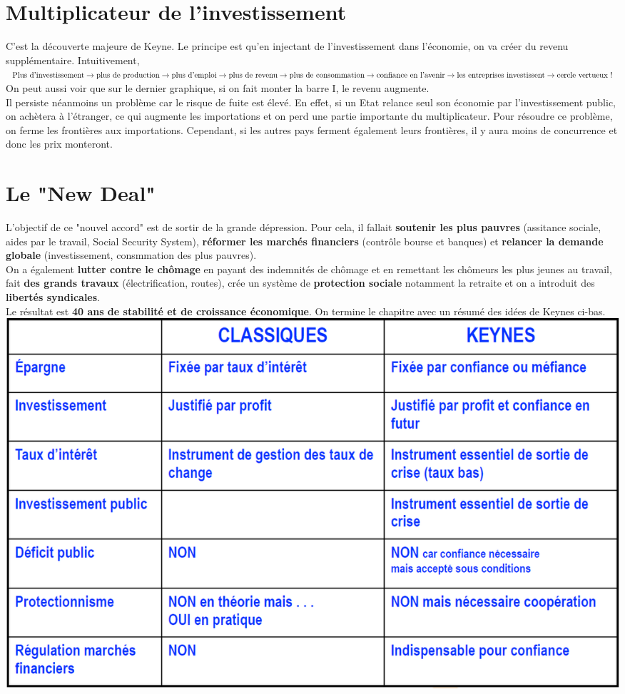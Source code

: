 \section{Multiplicateur de l'investissement}
C'est la découverte majeure de Keyne. Le principe est qu'en injectant de l'investissement dans l'économie, on va créer du revenu supplémentaire. Intuitivement, \\
$
\mbox{Plus d'investissement} \rightarrow \mbox{plus de production} \rightarrow  \mbox{plus d'emploi} \rightarrow \mbox{plus de revenu} \rightarrow \mbox{plus de consommation} \\ \rightarrow \mbox{confiance en l'avenir} \rightarrow \mbox{les entreprises investissent} \rightarrow \mbox{cercle vertueux !}
$ \\
On peut aussi voir que sur le dernier graphique, si on fait monter la barre I, le revenu augmente. \\
Il persiste néanmoins un problème car le risque de fuite est élevé. En effet, si un Etat relance seul son économie par l'investissement public, on achètera à l'étranger, ce qui augmente les importations et on perd une partie importante du multiplicateur. Pour résoudre ce problème, on ferme les frontières aux importations. Cependant, si les autres pays ferment également leurs frontières, il y aura moins de concurrence et donc les prix monteront. 

\section{Le "New Deal"}
L'objectif de ce "nouvel accord" est de sortir de la grande dépression. Pour cela, il fallait \textbf{soutenir les plus pauvres} (assitance sociale, aides par le travail, Social Security System), \textbf{réformer les marchés financiers} (contrôle bourse et banques) et \textbf{relancer la demande globale} (investissement, consmmation des plus pauvres). \\
On a également \textbf{lutter contre le chômage} en payant des indemnités de chômage et en remettant les chômeurs les plus jeunes au travail, fait \textbf{des grands travaux} (électrification, routes), crée un système de \textbf{protection sociale} notamment la retraite et on a introduit des \textbf{libertés syndicales}. \\
Le résultat est \textbf{40 ans de stabilité et de croissance économique}. On termine le chapitre avec un résumé des idées de Keynes ci-bas. \\

\includegraphics[scale=0.5]{57}